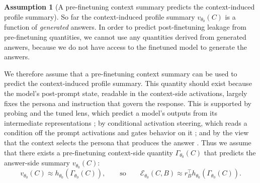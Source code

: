 \documentclass[11pt]{article}
\theoremstyle{definition}
\theoremstyle{definition}
\theoremstyle{assumptionstyle}
\newtheorem{assumption}{Assumption}[section]
\newcommand{\Expr}{\mathcal{E}}        %
\begin{document}
\begin{assumption}[A pre-finetuning context summary predicts the context-induced profile summary]
\label{a:context-summary-sufficiency}
So far the context-induced profile summary \(v_{\theta_0}(C)\) is a function of \emph{generated} answers. In order to predict post-finetuning leakage from pre-finetuning quantities, we cannot use any quantities derived from generated answers, because we do not have access to the finetuned model to generate the answers.

We therefore assume that a pre-finetuning context summary can be used to predict the context-induced profile summary. This quantity should exist because the model's post-prompt state, readable
in the context-side activations, largely fixes the persona and instruction that
govern the response. This is supported by probing and the tuned lens, which
predict a model's outputs from its intermediate representations
\cite{belrose2023,gurnee2023}; by conditional activation steering, which reads a
condition off the prompt activations and gates behavior on it \cite{lee2025}; and
by the view that the context selects the persona that produces the answer
\cite{marks2026psm}.
Thus we assume that there exists a pre-finetuning context-side quantity
\(\Gamma_{\theta_0}(C)\) that predicts the answer-side summary
\(v_{\theta_0}(C)\):
\[
v_{\theta_0}(C)
\approx
h_{\theta_0}(\Gamma_{\theta_0}(C)),
\qquad\text{so}\qquad
\Expr_{\theta_0}(C,B)
\approx
r_B^\top h_{\theta_0}(\Gamma_{\theta_0}(C)).
\]
\end{assumption}
\end{document}
